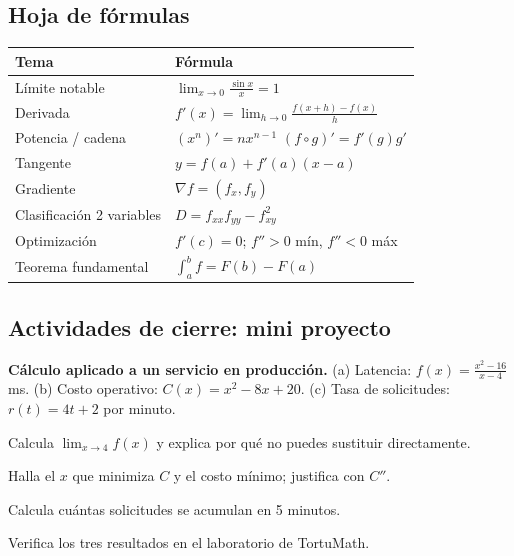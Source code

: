 \subsection{Hoja de f\'ormulas}
\begin{center}
\begin{tabular}{|p{4.2cm}|p{8.4cm}|}
\hline
\rowcolor{tmAzulClaro}\textbf{Tema} & \textbf{F\'ormula}\\ \hline
L\'imite notable & $\lim_{x\to0}\frac{\sin x}{x}=1$\\ \hline
Derivada & $f'(x)=\lim_{h\to0}\frac{f(x+h)-f(x)}h$\\ \hline
Potencia / cadena & $(x^n)'=nx^{n-1}$ \quad $(f\circ g)'=f'(g)g'$\\ \hline
Tangente & $y=f(a)+f'(a)(x-a)$\\ \hline
Gradiente & $\nabla f=(f_x, f_y)$\\ \hline
Clasificaci\'on 2 variables & $D=f_{xx}f_{yy}-f_{xy}^2$\\ \hline
Optimizaci\'on & $f'(c)=0$; $f''>0$ m\'in, $f''<0$ m\'ax\\ \hline
Teorema fundamental & $\int_a^bf=F(b)-F(a)$\\ \hline
\end{tabular}
\end{center}

\subsection{Actividades de cierre: mini proyecto}
\begin{tmsistemas}
\textbf{Cálculo aplicado a un servicio en producci\'on.} (a) Latencia: $f(x)=\frac{x^2-16}{x-4}$ ms. (b) Costo operativo: $C(x)=x^2-8x+20$. (c) Tasa de solicitudes: $r(t)=4t+2$ por minuto.
\end{tmsistemas}

\begin{tmlista}
\item Calcula $\lim_{x\to4}f(x)$ y explica por qu\'e no puedes sustituir directamente.
\item Halla el $x$ que minimiza $C$ y el costo m\'inimo; justifica con $C''$.
\item Calcula cu\'antas solicitudes se acumulan en 5 minutos.
\item Verifica los tres resultados en el laboratorio de TortuMath.
\end{tmlista}


